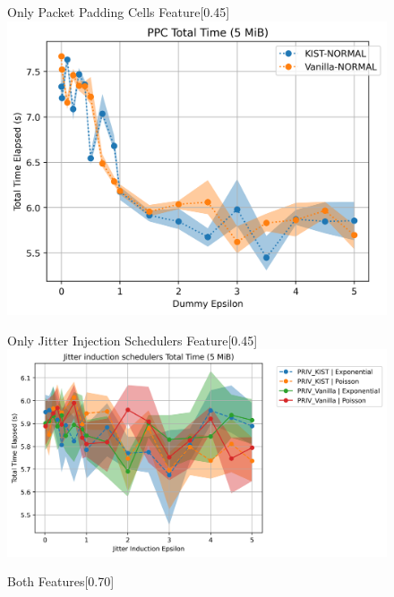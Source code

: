 \begin{figure}[htbp]
    \centering
    \begin{subcaptionbox}{Only Packet Padding Cells Feature\label{fig:dist_ppc_total_time}}[0.45\textwidth]
        {\includegraphics[width=\linewidth]{Chapters/Figures/Plots/dist_total_time_50_PPC_5mib.png}}
    \end{subcaptionbox}
    \hfill
    \begin{subcaptionbox}{Only Jitter Injection Schedulers Feature\label{fig:dist_jitter_total_time}}[0.45\textwidth]
        {\includegraphics[width=\linewidth]{Chapters/Figures/Plots/dist_total_time_50_jitter_5mib.png}}
    \end{subcaptionbox}
    \vfill
    \begin{subcaptionbox}{Both Features\label{fig:dist_both_total_time}}[0.70\textwidth]

\end{subcaptionbox}
\end{figure}
